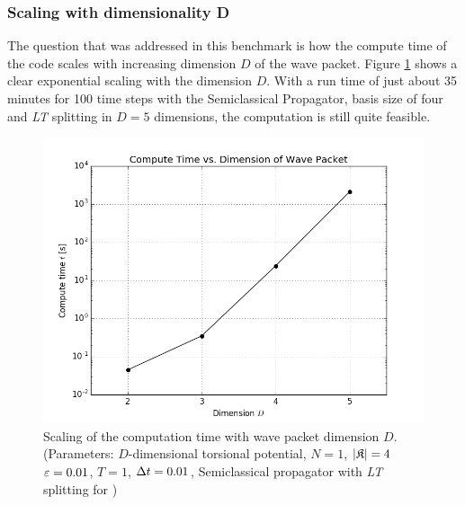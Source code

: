 \subsubsection{Scaling with dimensionality D}
%
The question that was addressed in this benchmark is how the compute time of the code scales with increasing dimension $D$ of the wave packet.
Figure \ref{fig:dimension_analysis} shows a clear exponential scaling with the dimension $D$.
With a run time of just about 35 minutes for 100 time steps with the Semiclassical Propagator, basis size of four and \emph{LT} splitting in $D=5$ dimensions, the computation is still quite feasible.
%
\begin{figure}[ht]
	\centering
	\includegraphics[width=.8\textwidth]{figures/dim.png}
	\caption{Scaling of the computation time with wave packet dimension $D$.
	(Parameters: $D$-dimensional torsional potential, $N=1$, $|\mathfrak{K}|=4$ $\varepsilon=0.01$, $T=1$, $\Delta t=0.01$, Semiclassical propagator with \emph{LT} splitting for )}
	\label{fig:dimension_analysis}
\end{figure}
